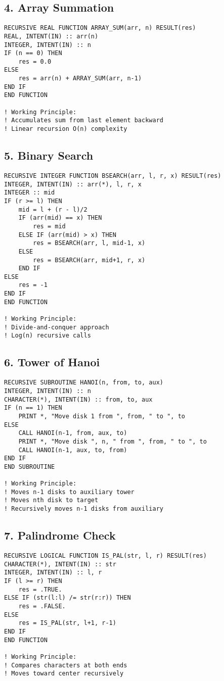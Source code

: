 \documentclass{book}
\begin{document}
\subsection*{4. Array Summation}
\begin{verbatim}
RECURSIVE REAL FUNCTION ARRAY_SUM(arr, n) RESULT(res)
REAL, INTENT(IN) :: arr(n)
INTEGER, INTENT(IN) :: n
IF (n == 0) THEN
    res = 0.0
ELSE
    res = arr(n) + ARRAY_SUM(arr, n-1)
END IF
END FUNCTION

! Working Principle:
! Accumulates sum from last element backward
! Linear recursion O(n) complexity
\end{verbatim}

\subsection*{5. Binary Search}
\begin{verbatim}
RECURSIVE INTEGER FUNCTION BSEARCH(arr, l, r, x) RESULT(res)
INTEGER, INTENT(IN) :: arr(*), l, r, x
INTEGER :: mid
IF (r >= l) THEN
    mid = l + (r - l)/2
    IF (arr(mid) == x) THEN
        res = mid
    ELSE IF (arr(mid) > x) THEN
        res = BSEARCH(arr, l, mid-1, x)
    ELSE
        res = BSEARCH(arr, mid+1, r, x)
    END IF
ELSE
    res = -1
END IF
END FUNCTION

! Working Principle:
! Divide-and-conquer approach
! Log(n) recursive calls
\end{verbatim}

\subsection*{6. Tower of Hanoi}
\begin{verbatim}
RECURSIVE SUBROUTINE HANOI(n, from, to, aux)
INTEGER, INTENT(IN) :: n
CHARACTER(*), INTENT(IN) :: from, to, aux
IF (n == 1) THEN
    PRINT *, "Move disk 1 from ", from, " to ", to
ELSE
    CALL HANOI(n-1, from, aux, to)
    PRINT *, "Move disk ", n, " from ", from, " to ", to
    CALL HANOI(n-1, aux, to, from)
END IF
END SUBROUTINE

! Working Principle:
! Moves n-1 disks to auxiliary tower
! Moves nth disk to target
! Recursively moves n-1 disks from auxiliary
\end{verbatim}

\subsection*{7. Palindrome Check}
\begin{verbatim}
RECURSIVE LOGICAL FUNCTION IS_PAL(str, l, r) RESULT(res)
CHARACTER(*), INTENT(IN) :: str
INTEGER, INTENT(IN) :: l, r
IF (l >= r) THEN
    res = .TRUE.
ELSE IF (str(l:l) /= str(r:r)) THEN
    res = .FALSE.
ELSE
    res = IS_PAL(str, l+1, r-1)
END IF
END FUNCTION

! Working Principle:
! Compares characters at both ends
! Moves toward center recursively
\end{verbatim}
\end{document}
